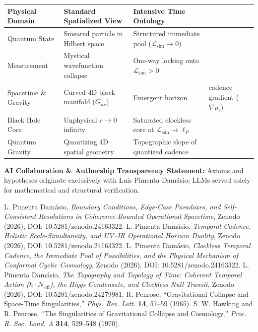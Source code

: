 \documentclass[11pt,a4paper]{article}
\begin{document}
\begin{table}[h]
\centering
\small
\begin{tabular}{p{3.2cm}p{5.0cm}p{5.8cm}}
\hline
\textbf{Physical Domain} & \textbf{Standard Spatialized View} & \textbf{Intensive Time Ontology} \\
\hline
Quantum State & Smeared particle in Hilbert space & Structured immediate pool ($\mathcal{L}_{\mathrm{sim}} \to 0$) \\
Measurement & Mystical wavefunction collapse & One-way locking onto $\mathcal{L}_{\mathrm{sim}} > 0$ \\
Spacetime \& Gravity & Curved 4D block manifold ($G_{\mu\nu}$) & Emergent horizon & cadence gradient ($\nabla \rho_\tau$) \\
Black Hole Core & Unphysical $r \to 0$ infinity & Saturated clockless core at $\mathcal{L}_{\mathrm{sim}} \to \ell_P$ \\
Quantum Gravity & Quantizing 4D spatial geometry & Topographic slope of quantized cadence \\
\hline
\end{tabular}
\end{table}

\noindent\textbf{AI Collaboration \& Authorship Transparency Statement:} Axioms and hypotheses originate exclusively with Lu\'is Pimenta Dam\'asio; LLMs served solely for mathematical and structural verification.

\begin{thebibliography}{9}
 L. Pimenta Dam\'asio, \emph{Boundary Conditions, Edge-Case Paradoxes, and Self-Consistent Resolutions in Coherence-Bounded Operational Spacetime}, Zenodo (2026), DOI: 10.5281/zenodo.24163322.
 L. Pimenta Dam\'asio, \emph{Temporal Cadence, Holistic Scale-Simultaneity, and UV--IR Operational Horizon Duality}, Zenodo (2026), DOI: 10.5281/zenodo.24163322.
 L. Pimenta Dam\'asio, \emph{Clockless Temporal Cadence, the Immediate Pool of Possibilities, and the Physical Mechanism of Conformal Cyclic Cosmology}, Zenodo (2026), DOI: 10.5281/zenodo.24163322.
 L. Pimenta Dam\'asio, \emph{The Topography and Topology of Time: Coherent Temporal Action ($h \cdot \mathcal{N}_{\mathrm{eff}}$), the Higgs Condensate, and Clockless Null Transit}, Zenodo (2026), DOI: 10.5281/zenodo.24279981.
 R. Penrose, ``Gravitational Collapse and Space-Time Singularities,'' \emph{Phys. Rev. Lett.} \textbf{14}, 57--59 (1965).
 S. W. Hawking and R. Penrose, ``The Singularities of Gravitational Collapse and Cosmology,'' \emph{Proc. R. Soc. Lond. A} \textbf{314}, 529--548 (1970).
\end{thebibliography}
\end{document}
